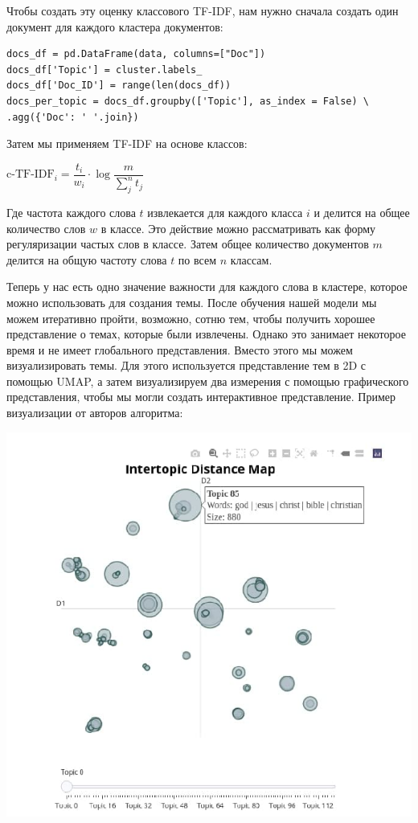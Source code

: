 Чтобы создать эту оценку классового TF-IDF, нам нужно сначала создать один документ для каждого кластера документов:

\begin{verbatim}
docs_df = pd.DataFrame(data, columns=["Doc"])
docs_df['Topic'] = cluster.labels_
docs_df['Doc_ID'] = range(len(docs_df))
docs_per_topic = docs_df.groupby(['Topic'], as_index = False) \
.agg({'Doc': ' '.join})
\end{verbatim}

Затем мы применяем TF-IDF на основе классов:

\begin{center}
$\text{c-TF-IDF}_{i} = 
\dfrac{t_i}{w_i} \cdot 
\log{
\dfrac{m}{\sum\limits_j^n t_j}}$
\end{center}

Где частота каждого слова $t$ извлекается для каждого класса $i$ и делится на общее количество слов $w$ в классе. Это действие можно рассматривать как форму регуляризации частых слов в классе. Затем общее количество документов $m$ делится на общую частоту слова $t$ по всем $n$ классам.

Теперь у нас есть одно значение важности для каждого слова в кластере, которое можно использовать для создания темы. После обучения нашей модели мы можем итеративно пройти, возможно, сотню тем, чтобы получить хорошее представление о темах, которые были извлечены. Однако это занимает некоторое время и не имеет глобального представления. Вместо этого мы можем визуализировать темы. Для этого используется представление тем в 2D с помощью UMAP, а затем визуализируем два измерения с помощью графического представления, чтобы мы могли создать интерактивное представление. Пример визуализации от авторов алгоритма:

\includegraphics[scale=0.9]{pics/bertopic-visual-1.jpg}

